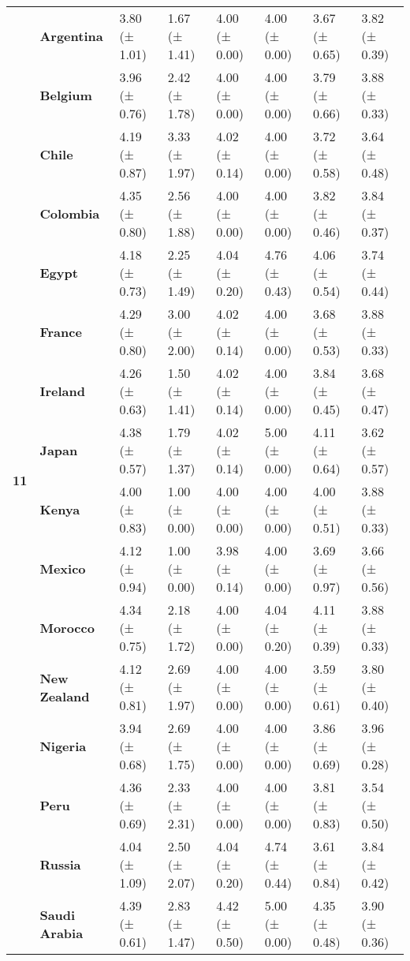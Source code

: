 \begin{tabular}{llllllll}
\cline{1-8}
\multirow[t]{19}{*}{\textbf{11}} & \textbf{Argentina} & 3.80 (± 1.01) & 1.67 (± 1.41) & 4.00 (± 0.00) & 4.00 (± 0.00) & 3.67 (± 0.65) & 3.82 (± 0.39) \\
\textbf{} & \textbf{Belgium} & 3.96 (± 0.76) & 2.42 (± 1.78) & 4.00 (± 0.00) & 4.00 (± 0.00) & 3.79 (± 0.66) & 3.88 (± 0.33) \\
\textbf{} & \textbf{Chile} & 4.19 (± 0.87) & 3.33 (± 1.97) & 4.02 (± 0.14) & 4.00 (± 0.00) & 3.72 (± 0.58) & 3.64 (± 0.48) \\
\textbf{} & \textbf{Colombia} & 4.35 (± 0.80) & 2.56 (± 1.88) & 4.00 (± 0.00) & 4.00 (± 0.00) & 3.82 (± 0.46) & 3.84 (± 0.37) \\
\textbf{} & \textbf{Egypt} & 4.18 (± 0.73) & 2.25 (± 1.49) & 4.04 (± 0.20) & 4.76 (± 0.43) & 4.06 (± 0.54) & 3.74 (± 0.44) \\
\textbf{} & \textbf{France} & 4.29 (± 0.80) & 3.00 (± 2.00) & 4.02 (± 0.14) & 4.00 (± 0.00) & 3.68 (± 0.53) & 3.88 (± 0.33) \\
\textbf{} & \textbf{Ireland} & 4.26 (± 0.63) & 1.50 (± 1.41) & 4.02 (± 0.14) & 4.00 (± 0.00) & 3.84 (± 0.45) & 3.68 (± 0.47) \\
\textbf{} & \textbf{Japan} & 4.38 (± 0.57) & 1.79 (± 1.37) & 4.02 (± 0.14) & 5.00 (± 0.00) & 4.11 (± 0.64) & 3.62 (± 0.57) \\
\textbf{} & \textbf{Kenya} & 4.00 (± 0.83) & 1.00 (± 0.00) & 4.00 (± 0.00) & 4.00 (± 0.00) & 4.00 (± 0.51) & 3.88 (± 0.33) \\
\textbf{} & \textbf{Mexico} & 4.12 (± 0.94) & 1.00 (± 0.00) & 3.98 (± 0.14) & 4.00 (± 0.00) & 3.69 (± 0.97) & 3.66 (± 0.56) \\
\textbf{} & \textbf{Morocco} & 4.34 (± 0.75) & 2.18 (± 1.72) & 4.00 (± 0.00) & 4.04 (± 0.20) & 4.11 (± 0.39) & 3.88 (± 0.33) \\
\textbf{} & \textbf{New Zealand} & 4.12 (± 0.81) & 2.69 (± 1.97) & 4.00 (± 0.00) & 4.00 (± 0.00) & 3.59 (± 0.61) & 3.80 (± 0.40) \\
\textbf{} & \textbf{Nigeria} & 3.94 (± 0.68) & 2.69 (± 1.75) & 4.00 (± 0.00) & 4.00 (± 0.00) & 3.86 (± 0.69) & 3.96 (± 0.28) \\
\textbf{} & \textbf{Peru} & 4.36 (± 0.69) & 2.33 (± 2.31) & 4.00 (± 0.00) & 4.00 (± 0.00) & 3.81 (± 0.83) & 3.54 (± 0.50) \\
\textbf{} & \textbf{Russia} & 4.04 (± 1.09) & 2.50 (± 2.07) & 4.04 (± 0.20) & 4.74 (± 0.44) & 3.61 (± 0.84) & 3.84 (± 0.42) \\
\textbf{} & \textbf{Saudi Arabia} & 4.39 (± 0.61) & 2.83 (± 1.47) & 4.42 (± 0.50) & 5.00 (± 0.00) & 4.35 (± 0.48) & 3.90 (± 0.36) \\

\end{tabular}
